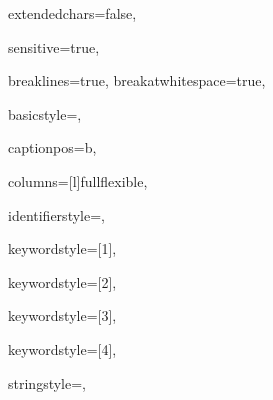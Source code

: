 {%
extendedchars=false,

sensitive=true,

breaklines=true,
breakatwhitespace=true,

basicstyle=\color{black}\ttfamily\small,

captionpos=b,

columns=[l]fullflexible,


identifierstyle={\ttfamily\color{draculaGrey}},

keywordstyle=[1]{\ttfamily\color{keywordcolor}},

keywordstyle=[2]{\ttfamily\color{sortcolor}},

keywordstyle=[3]{\ttfamily\color{tacticcolor}},

keywordstyle=[4]{\ttfamily\color{attributecolor}},

stringstyle=\ttfamily,


}
